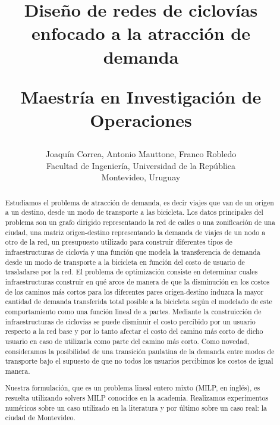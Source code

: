 \documentclass{article}
\begin{document}
  \title{
    Diseño de redes de ciclovías enfocado a la atracción de demanda

    {\sc \large Maestría en Investigación de Operaciones}
    \linebreak
  }
  \author{
    Joaquín Correa, Antonio Mauttone, Franco Robledo \\

    {\small Facultad de Ingeniería, Universidad de la República} \\

    {\small Montevideo, Uruguay}
  }
  \maketitle

  \newpage
  \tableofcontents

  \newpage
  \begin{abstract}
    Estudiamos el problema de atracción de demanda, es decir viajes que van de un origen a un destino, desde un modo de transporte a las bicicleta. Los datos principales del problema son un grafo dirigido representando la red de calles o una zonificación de una ciudad, una matriz origen-destino representando la demanda de viajes de un nodo a otro de la red, un presupuesto utilizado para construir diferentes tipos de infraestructuras de ciclovía y una función que modela la transferencia de demanda desde un modo de transporte a la bicicleta en función del costo de usuario de trasladarse por la red. El problema de optimización consiste en determinar cuales infraestructuras construir en qué arcos de manera de que la disminución en los costos de los caminos más cortos para los diferentes pares origen-destino induzca la mayor cantidad de demanda transferida total posible a la bicicleta según el modelado de este comportamiento como una función lineal de a partes. Mediante la construicción de infraestructuras de ciclovías se puede disminuir el costo percibido por un usuario respecto a la red base y por lo tanto afectar el costo del camino más corto de dicho usuario en caso de utilizarla como parte del camino más corto. Como novedad, consideramos la posibilidad de una transición paulatina de la demanda entre modos de transporte bajo el supuesto de que no todos los usuarios percibimos los costos de igual manera.

    Nuestra formulación, que es un problema lineal entero mixto (MILP, en inglés), es resuelta utilizando solvers MILP conocidos en la academia. Realizamos experimentos numéricos sobre un caso utilizado en la literatura y por último sobre un caso real: la ciudad de Montevideo.
  \end{abstract}
\end{document}
